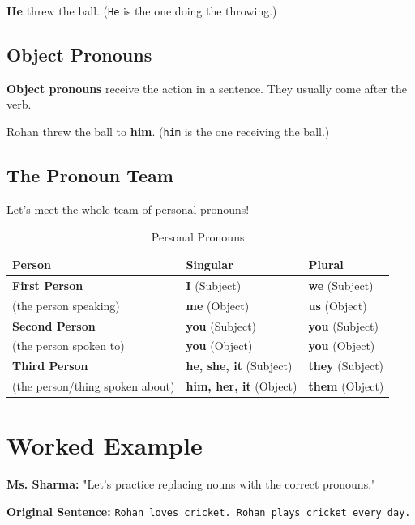 \begin{examplebox}
    \textbf{He} threw the ball. (\texttt{He} is the one doing the throwing.)
\end{examplebox}

\subsection*{Object Pronouns}
\textbf{Object pronouns} receive the action in a sentence. They usually come after the verb.

\begin{examplebox}
    Rohan threw the ball to \textbf{him}. (\texttt{him} is the one receiving the ball.)
\end{examplebox}

\subsection*{The Pronoun Team}
Let's meet the whole team of personal pronouns!

\begin{table}[h!]
\centering
\begin{tabular}{|l|l|l|}
\hline
\textbf{Person} & \textbf{Singular} & \textbf{Plural} \\
\hline
\textbf{First Person} & \textbf{I} (Subject) & \textbf{we} (Subject) \\
(the person speaking) & \textbf{me} (Object) & \textbf{us} (Object) \\
\hline
\textbf{Second Person} & \textbf{you} (Subject) & \textbf{you} (Subject) \\
(the person spoken to) & \textbf{you} (Object) & \textbf{you} (Object) \\
\hline
\textbf{Third Person} & \textbf{he, she, it} (Subject) & \textbf{they} (Subject) \\
(the person/thing spoken about) & \textbf{him, her, it} (Object) & \textbf{them} (Object) \\
\hline
\end{tabular}
\caption{Personal Pronouns}
\end{table}

\section{Worked Example}
\textbf{Ms. Sharma:} "Let's practice replacing nouns with the correct pronouns."

\textbf{Original Sentence:} \texttt{Rohan loves cricket. Rohan plays cricket every day.}


